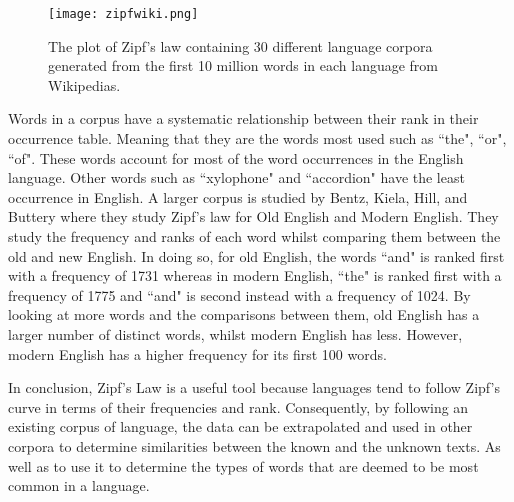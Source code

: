 \begin{figure}[!htb]
	\centering
	\texttt{[image: zipfwiki.png]}
	\caption{The plot of Zipf's law containing 30 different language corpora generated from the first 10 million words in each language from Wikipedias.}
	\label{fig:zipfwiki}
\end{figure}

Words in a corpus have a systematic relationship between their rank in their occurrence table. Meaning that they are the words most used such as ``the", ``or", ``of". These words account for most of the word occurrences in the English language. Other words such as ``xylophone" and ``accordion" have the least occurrence in English. A larger corpus is studied by Bentz, Kiela, Hill, and Buttery \cite{BentzKielaHillButtery} where they study Zipf's law for Old English and Modern English. They study the frequency and ranks of each word whilst comparing them between the old and new English. In doing so, for old English, the words ``and" is ranked first with a frequency of 1731 whereas in modern English, ``the" is ranked first with a frequency of 1775 and ``and" is second instead with a frequency of 1024. By looking at more words and the comparisons between them, old English has a larger number of distinct words, whilst modern English has less. However, modern English has a higher frequency for its first 100 words.

In conclusion, Zipf's Law is a useful tool because languages tend to follow Zipf's curve in terms of their frequencies and rank. Consequently, by following an existing corpus of language, the data can be extrapolated and used in other corpora to determine similarities between the known and the unknown texts. As well as to use it to determine the types of words that are deemed to be most common in a language.
